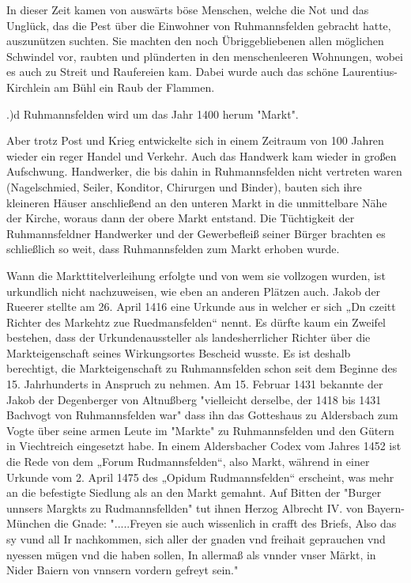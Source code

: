 In dieser Zeit kamen von auswärts böse Menschen, welche die Not und das Unglück,
das die Pest über die Einwohner von Ruhmannsfelden gebracht hatte, auszunützen
suchten. Sie machten den noch Übriggebliebenen allen möglichen Schwindel vor,
raubten und plünderten in den menschenleeren Wohnungen, wobei es auch zu Streit
und Raufereien kam. Dabei wurde auch das schöne Laurentius-Kirchlein am Bühl ein
Raub der Flammen.

.)d Ruhmannsfelden wird um das Jahr 1400 herum "Markt".

Aber trotz Post und Krieg entwickelte sich in einem Zeitraum von 100 Jahren
wieder ein reger Handel und Verkehr. Auch das Handwerk kam wieder in großen
Aufschwung. Handwerker, die bis dahin in Ruhmannsfelden nicht vertreten waren
(Nagelschmied, Seiler, Konditor, Chirurgen und Binder), bauten sich ihre
kleineren Häuser anschließend an den unteren Markt in die unmittelbare Nähe der
Kirche, woraus dann der obere Markt entstand. Die Tüchtigkeit der
Ruhmannsfeldner Handwerker und der Gewerbefleiß seiner Bürger brachten es
schließlich so weit, dass Ruhmannsfelden zum Markt erhoben wurde.

Wann die Markttitelverleihung erfolgte und von wem sie vollzogen wurden, ist
urkundlich nicht nachzuweisen, wie eben an anderen Plätzen auch. Jakob der
Rueerer stellte am 26. April 1416 eine Urkunde aus in welcher er sich „Dn czeitt
Richter des Markehtz zue Ruedmansfelden“ nennt. Es dürfte kaum ein Zweifel
bestehen, dass der Urkundenaussteller als landesherrlicher Richter über die
Markteigenschaft seines Wirkungsortes Bescheid wusste. Es ist deshalb
berechtigt, die Markteigenschaft zu Ruhmannsfelden schon seit dem Beginne des
15. Jahrhunderts in Anspruch zu nehmen. Am 15. Februar 1431 bekannte der Jakob
der Degenberger von Altnußberg "vielleicht derselbe, der 1418 bis 1431 Bachvogt
von Ruhmannsfelden war" dass ihn das Gotteshaus zu Aldersbach zum Vogte über
seine armen Leute im "Markte" zu Ruhmannsfelden und den Gütern in Viechtreich
eingesetzt habe. In einem Aldersbacher Codex vom Jahres 1452 ist die Rede von
dem „Forum Rudmannsfelden“, also Markt, während in einer Urkunde vom 2. April
1475 des „Opidum Rudmannsfelden“ erscheint, was mehr an die befestigte Siedlung
als an den Markt gemahnt. Auf Bitten der "Burger unnsers Margkts zu
Rudmannsfellden" tut ihnen Herzog Albrecht IV. von Bayern-München die Gnade:
".....Freyen sie auch wissenlich in crafft des Briefs, Also das sy vund all Ir
nachkommen, sich aller der gnaden vnd freihait geprauchen vnd nyessen mügen vnd
die haben sollen, In allermaß als vnnder vnser Märkt, in Nider Baiern von
vnnsern vordern gefreyt sein."

